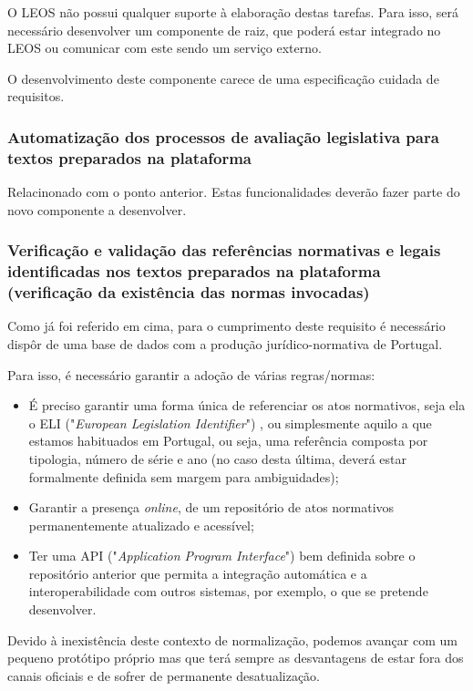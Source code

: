 O LEOS não possui qualquer suporte à elaboração destas tarefas.
Para isso, será necessário desenvolver um componente de raiz, que poderá estar integrado no LEOS ou comunicar com este 
sendo um serviço externo.

O desenvolvimento deste componente carece de uma especificação cuidada de requisitos.

\subsubsection{Automatização dos processos de avaliação legislativa para textos preparados na plataforma}

Relacinonado com o ponto anterior. Estas funcionalidades deverão fazer parte do novo componente a desenvolver.

\subsubsection{Verificação e validação das referências normativas e legais identificadas nos textos preparados
na plataforma (verificação da existência das normas invocadas)}
\label{bases_legis}

Como já foi referido em cima, para o cumprimento deste requisito é necessário dispôr de uma base de dados com a 
produção jurídico-normativa de Portugal.

Para isso, é necessário garantir a adoção de várias regras/normas:

\begin{itemize}
    \item É preciso garantir uma forma única de referenciar os atos normativos, seja ela o ELI 
    ("\emph{European Legislation Identifier}") \cite{ELI}, ou simplesmente aquilo a que estamos habituados em Portugal, ou 
    seja, uma referência composta por tipologia, número de série e ano (no caso desta última, deverá 
    estar formalmente definida sem margem para ambiguidades); 

    \item Garantir a presença \emph{online}, de um repositório de atos normativos permanentemente atualizado e acessível;
    \item Ter uma API ("\emph{Application Program Interface}") bem definida sobre o repositório anterior que permita a 
    integração automática e a interoperabilidade com outros sistemas, por exemplo, o que se pretende desenvolver.
\end{itemize}

Devido à inexistência deste contexto de normalização, podemos avançar com um pequeno protótipo próprio 
mas que terá sempre as desvantagens de 
estar fora dos canais oficiais e de sofrer de permanente desatualização.


